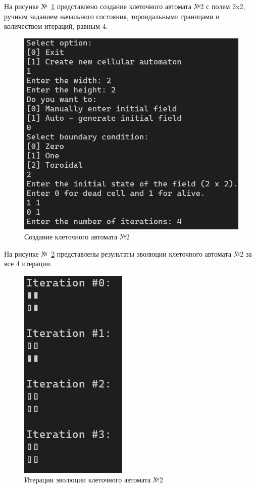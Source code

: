 \documentclass[a4paper, final]{article}
\begin{document}
На рисунке №~\ref{img:example2} представлено создание клеточного автомата №2 с полем 2x2, ручным заданием начального
состояния, тороидальными границами и количеством итераций, равным 4.
\begin{figure}[H]
   \centering
   \includegraphics[scale=0.6]{example2.png}
   \caption{Создание клеточного автомата №2}
   \label{img:example2}
\end{figure}

На рисунке №~\ref{img:example2_res} представлены результаты эволюции клеточного автомата №2 за все 4 итерации.

\begin{figure}[H]
  \centering
  \includegraphics[scale=0.6]{example2_res.png}
  \caption{Итерации эволюции клеточного автомата №2}
  \label{img:example2_res}
\end{figure}
\end{document}
